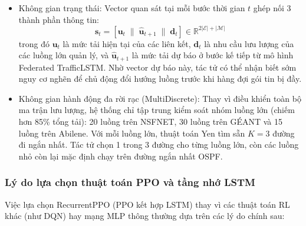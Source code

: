 \documentclass[11pt,a4paper]{article}
\begin{document}
\begin{itemize}[leftmargin=1.5em, itemsep=0.3ex]
    \item Không gian trạng thái: Vector quan sát tại mỗi bước thời gian $t$ ghép nối 3 thành phần thông tin:
    \begin{equation}
        \mathbf{s}_t = \left[ \mathbf{u}_t \;\parallel\; \mathbf{\hat{u}}_{t+1} \;\parallel\; \mathbf{d}_t \right] \in \mathbb{R}^{2|\mathcal{E}| + |\mathcal{M}|}
    \end{equation}
    trong đó $\mathbf{u}_t$ là mức tải hiện tại của các liên kết, $\mathbf{d}_t$ là nhu cầu lưu lượng của các luồng lớn quản lý, và $\mathbf{\hat{u}}_{t+1}$ là mức tải dự báo ở bước kế tiếp từ mô hình Federated TrafficLSTM. Nhờ vector dự báo này, tác tử có thể nhận biết sớm nguy cơ nghẽn để chủ động đổi hướng luồng trước khi hàng đợi gói tin bị đầy.
    
    \item Không gian hành động đa rời rạc (MultiDiscrete): Thay vì điều khiển toàn bộ ma trận lưu lượng, hệ thống chỉ tập trung kiểm soát nhóm luồng lớn (chiếm hơn 85\% tổng tải): 20 luồng trên NSFNET, 30 luồng trên GÉANT và 15 luồng trên Abilene. Với mỗi luồng lớn, thuật toán Yen tìm sẵn $K = 3$ đường đi ngắn nhất. Tác tử chọn 1 trong 3 đường cho từng luồng lớn, còn các luồng nhỏ còn lại mặc định chạy trên đường ngắn nhất OSPF.
\end{itemize}

\subsubsection*{Lý do lựa chọn thuật toán PPO và tầng nhớ LSTM}
Việc lựa chọn RecurrentPPO (PPO kết hợp LSTM) thay vì các thuật toán RL khác (như DQN) hay mạng MLP thông thường dựa trên các lý do chính sau:
\end{document}
